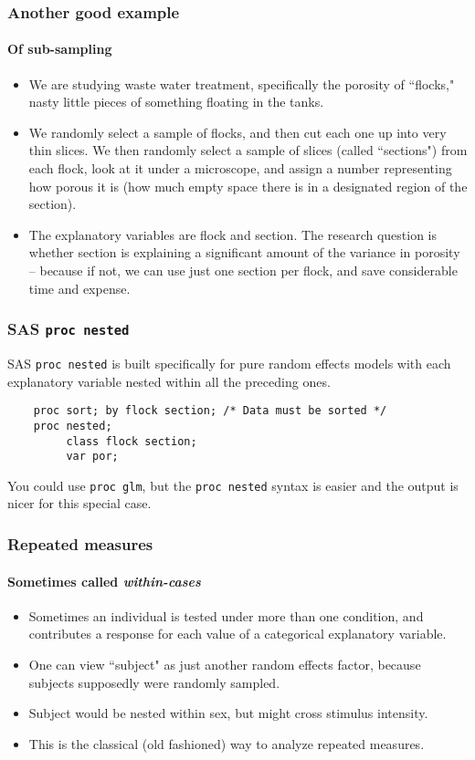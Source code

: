 \documentclass[serif]{beamer} %
\begin{document}
\begin{frame} 
\frametitle{Another good example}
\framesubtitle{Of sub-sampling} 
  \begin{itemize}
    \item We are studying waste water treatment, specifically the porosity of ``flocks," nasty little pieces of something floating in the tanks.
    \item We randomly select a sample of flocks, and then cut each one up into very thin slices.  We then randomly select a sample of slices (called ``sections") from each flock, look at it under a microscope, and assign a number representing how porous it is (how much empty space there is in a designated region of the section).
    \item The explanatory variables are flock and section.  The research question is whether section is explaining a significant amount of the variance in porosity -- because if not, we can use just one section per flock, and save considerable time and expense.
  \end{itemize}
\end{frame}

\begin{frame}[fragile]
\frametitle{SAS \texttt{proc nested}}
SAS \texttt{proc nested} is built specifically for pure random effects models with each explanatory variable nested within all the preceding ones.
\begin{verbatim}
	proc sort; by flock section; /* Data must be sorted */
	proc nested;
	     class flock section;
	     var por;
\end{verbatim} 
You could use \texttt{proc glm}, but the \texttt{proc nested} syntax is easier and the output is nicer for this special case.
\end{frame}



\begin{frame}
\frametitle{Repeated measures}
\framesubtitle{Sometimes called \emph{within-cases}} 
  \begin{itemize}
    \item Sometimes an individual is tested under more than one condition, and contributes a response for each value of a categorical explanatory variable.
    \item One can view ``subject" as just another random effects factor, because subjects supposedly were randomly sampled.
    \item Subject would be nested within sex, but might cross stimulus intensity.
    \item This is the classical (old fashioned) way to analyze repeated measures.
  \end{itemize}
\end{frame}
\end{document}
